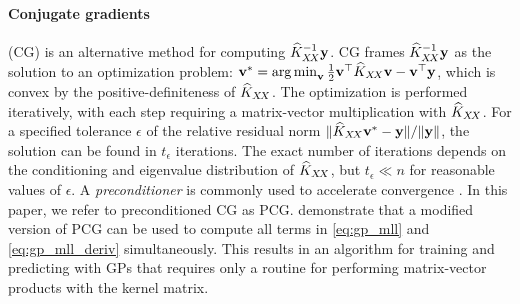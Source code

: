 \paragraph{Conjugate gradients} (CG) is an alternative method for computing $\widehat {K}_{X \! X}^{-1} \mathbf{y}$.
CG frames $\widehat {K}_{X \! X}^{-1} \mathbf{y}$ as the solution to an optimization problem: $\mathbf{v}^{*} =\operatorname*{arg\,min}_{\mathbf{v}} \frac 1 2 \mathbf{v}^\top \widehat {K}_{X \! X} \mathbf{v} - \mathbf{v}^\top \mathbf{y}$, which is convex by the positive-definiteness of $\widehat {K}_{X \! X}$.
The optimization is performed iteratively, with each step requiring a matrix-vector multiplication with $\widehat {K}_{X \! X}$.
For a specified tolerance $\epsilon$ of the relative residual norm ${\Vert \widehat {K}_{X \! X} \mathbf{v}^{*} - \mathbf{y} \Vert}/{\Vert \mathbf{y} \Vert}$, the solution can be found in $t_\epsilon$ iterations.
The exact number of iterations depends on the conditioning and eigenvalue
distribution of $\widehat {K}_{X \! X}$, but $t_\epsilon \ll n$ for reasonable values of $\epsilon$.
A \emph{preconditioner} is commonly used to accelerate convergence
\cite{golub2012matrix}. In this paper, we refer to preconditioned CG as PCG. \citet{gardner2018gpytorch} demonstrate that a modified version of PCG can be used to compute all terms in \eqref{eq:gp_mll} and \eqref{eq:gp_mll_deriv} simultaneously.
This results in an algorithm for training and predicting with GPs that requires only a routine for performing matrix-vector products with the kernel matrix.

